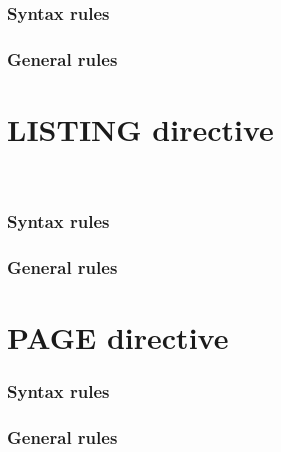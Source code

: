 \begin{syntax}
\end{syntax}

\subsubsection{Syntax rules}

\subsubsection{General rules}

\section{LISTING directive}

\begin{syntax}
  \directiveindicator{}
  \begin{1=}
     \\
  \end{1=}
\end{syntax}

\subsubsection{Syntax rules}

\subsubsection{General rules}

\section{PAGE directive}

\begin{syntax}
  \directiveindicator{}
  \begin{0-1}
  \end{0-1}
\end{syntax}

\subsubsection{Syntax rules}

\subsubsection{General rules}

